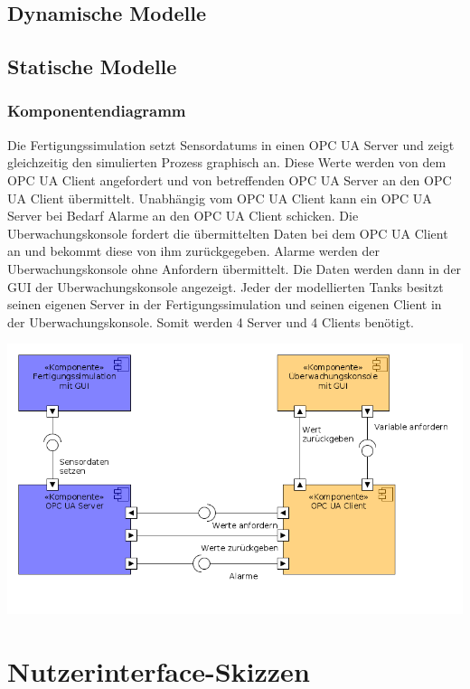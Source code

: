 \documentclass[parskip=full]{scrartcl}
\begin{document}
\subsection{Dynamische Modelle}
\Blindtext[1]

\subsection{Statische Modelle}
\subsubsection{Komponentendiagramm}
Die \gls{Fertigungssimulation} setzt \glspl{Sensordatum} in einen \gls{OPC UA Server} und zeigt
gleichzeitig den simulierten Prozess graphisch an. Diese Werte werden von dem \gls{OPC UA Client} angefordert
und von betreffenden \gls{OPC UA Server} an den \gls{OPC UA Client} übermittelt. Unabhängig vom \gls{OPC UA Client}
kann ein \gls{OPC UA Server} bei Bedarf Alarme an den \gls{OPC UA Client} schicken.
Die \gls{Uberwachungskonsole} fordert die übermittelten Daten bei dem \gls{OPC UA Client} an und bekommt
diese von ihm zurückgegeben. Alarme werden der \gls{Uberwachungskonsole} ohne Anfordern übermittelt.
Die Daten werden dann in der \gls{GUI} der \gls{Uberwachungskonsole} angezeigt. Jeder der modellierten Tanks
besitzt seinen eigenen Server in der \gls{Fertigungssimulation} und seinen eigenen Client in der \gls{Uberwachungskonsole}.
Somit werden 4 Server und 4 Clients benötigt.
\begin{center}
  \includegraphics[scale=0.5]{media/ComponentDiagram/componentDiagram.png}
\end{center}


\section{Nutzerinterface-Skizzen}
\end{document}
